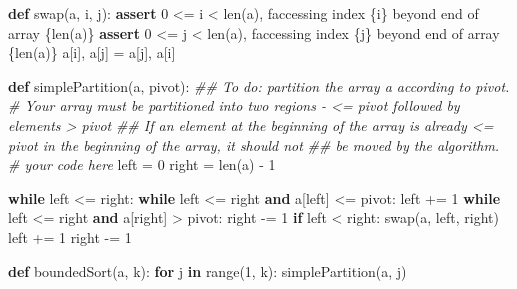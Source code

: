 \documentclass[
]{article}
\newenvironment{Shaded}{}{}
\newcommand{\BuiltInTok}[1]{\textcolor[rgb]{0.00,0.50,0.00}{#1}}
\newcommand{\CommentTok}[1]{\textcolor[rgb]{0.38,0.63,0.69}{\textit{#1}}}
\newcommand{\ControlFlowTok}[1]{\textcolor[rgb]{0.00,0.44,0.13}{\textbf{#1}}}
\newcommand{\DecValTok}[1]{\textcolor[rgb]{0.25,0.63,0.44}{#1}}
\newcommand{\KeywordTok}[1]{\textcolor[rgb]{0.00,0.44,0.13}{\textbf{#1}}}
\newcommand{\NormalTok}[1]{#1}
\newcommand{\OperatorTok}[1]{\textcolor[rgb]{0.40,0.40,0.40}{#1}}
\newcommand{\SpecialCharTok}[1]{\textcolor[rgb]{0.25,0.44,0.63}{#1}}
\newcommand{\SpecialStringTok}[1]{\textcolor[rgb]{0.73,0.40,0.53}{#1}}
\begin{document}
\begin{Shaded}
\begin{Highlighting}[]

\KeywordTok{def}\NormalTok{ swap(a, i, j):}
    \ControlFlowTok{assert} \DecValTok{0} \OperatorTok{\textless{}=}\NormalTok{ i }\OperatorTok{\textless{}} \BuiltInTok{len}\NormalTok{(a), }\SpecialStringTok{f\textquotesingle{}accessing index }\SpecialCharTok{\{}\NormalTok{i}\SpecialCharTok{\}}\SpecialStringTok{ beyond end of array }\SpecialCharTok{\{}\BuiltInTok{len}\NormalTok{(a)}\SpecialCharTok{\}}\SpecialStringTok{\textquotesingle{}}
    \ControlFlowTok{assert} \DecValTok{0} \OperatorTok{\textless{}=}\NormalTok{ j }\OperatorTok{\textless{}} \BuiltInTok{len}\NormalTok{(a), }\SpecialStringTok{f\textquotesingle{}accessing index }\SpecialCharTok{\{}\NormalTok{j}\SpecialCharTok{\}}\SpecialStringTok{ beyond end of array }\SpecialCharTok{\{}\BuiltInTok{len}\NormalTok{(a)}\SpecialCharTok{\}}\SpecialStringTok{\textquotesingle{}}
\NormalTok{    a[i], a[j] }\OperatorTok{=}\NormalTok{ a[j], a[i]}



\KeywordTok{def}\NormalTok{ simplePartition(a, pivot):}
    \CommentTok{\#\# To do: partition the array a according to pivot.}
    \CommentTok{\# Your array must be partitioned into two regions {-} \textless{}= pivot followed by elements \textgreater{} pivot}
    \CommentTok{\#\# If an element at the beginning of the array is already \textless{}= pivot in the beginning of the array, it should not}
    \CommentTok{\#\# be moved by the algorithm.}
    \CommentTok{\# your code here}
\NormalTok{    left }\OperatorTok{=} \DecValTok{0}
\NormalTok{    right }\OperatorTok{=} \BuiltInTok{len}\NormalTok{(a) }\OperatorTok{{-}} \DecValTok{1}

    \ControlFlowTok{while}\NormalTok{ left }\OperatorTok{\textless{}=}\NormalTok{ right:}
      \ControlFlowTok{while}\NormalTok{ left }\OperatorTok{\textless{}=}\NormalTok{ right }\KeywordTok{and}\NormalTok{ a[left] }\OperatorTok{\textless{}=}\NormalTok{ pivot:}
\NormalTok{          left }\OperatorTok{+=} \DecValTok{1}
      \ControlFlowTok{while}\NormalTok{ left }\OperatorTok{\textless{}=}\NormalTok{ right }\KeywordTok{and}\NormalTok{ a[right] }\OperatorTok{\textgreater{}}\NormalTok{ pivot:}
\NormalTok{          right }\OperatorTok{{-}=} \DecValTok{1}
      \ControlFlowTok{if}\NormalTok{ left }\OperatorTok{\textless{}}\NormalTok{ right:}
\NormalTok{          swap(a, left, right)}
\NormalTok{          left }\OperatorTok{+=} \DecValTok{1}
\NormalTok{          right }\OperatorTok{{-}=} \DecValTok{1}







\KeywordTok{def}\NormalTok{ boundedSort(a, k):}
    \ControlFlowTok{for}\NormalTok{ j }\KeywordTok{in} \BuiltInTok{range}\NormalTok{(}\DecValTok{1}\NormalTok{, k):}
\NormalTok{        simplePartition(a, j)}
\end{Highlighting}
\end{Shaded}
\end{document}
